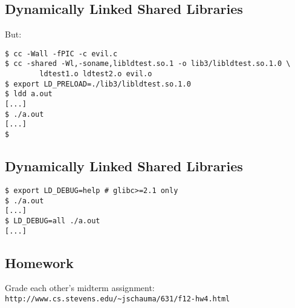 \documentclass[xga]{xdvislides}
\begin{document}
\subsection{Dynamically Linked Shared Libraries}
But:
\begin{verbatim}
$ cc -Wall -fPIC -c evil.c
$ cc -shared -Wl,-soname,libldtest.so.1 -o lib3/libldtest.so.1.0 \
        ldtest1.o ldtest2.o evil.o
$ export LD_PRELOAD=./lib3/libldtest.so.1.0
$ ldd a.out
[...]
$ ./a.out
[...]
$
\end{verbatim}

\subsection{Dynamically Linked Shared Libraries}
\begin{verbatim}
$ export LD_DEBUG=help # glibc>=2.1 only
$ ./a.out
[...]
$ LD_DEBUG=all ./a.out
[...]
\end{verbatim}

\subsection{Homework}
Grade each other's midterm assignment:
\\

\verb+http://www.cs.stevens.edu/~jschauma/631/f12-hw4.html+
\end{document}
